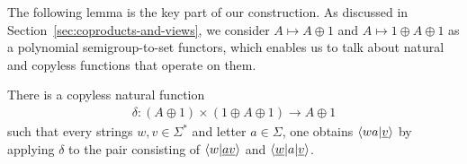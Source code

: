 The following lemma is the key part of our construction. As discussed in Section~\ref{sec:coproducts-and-views}, we consider $A \mapsto A \oplus 1$ and $A \mapsto 1 \oplus A \oplus 1$ as a polynomial semigroup-to-set functors, which enables us to talk about natural and copyless functions that operate on them.
\begin{lemma}\label{lem:compute-next-configuration}
    There is  a {copyless} natural function
    \begin{align*}
    \delta : (A \oplus 1) \times (1 \oplus A \oplus 1) \to A \oplus 1
    \end{align*} 
    such  that every strings $w,v \in \Sigma^*$ and letter $a \in \Sigma$, one obtains $\langle wa|\underline v \rangle$ by applying $\delta$ to the pair  consisting of  $\langle w|\underline {av} \rangle$ and $\langle \underline w | a|\underline v \rangle$.
    \end{lemma}
